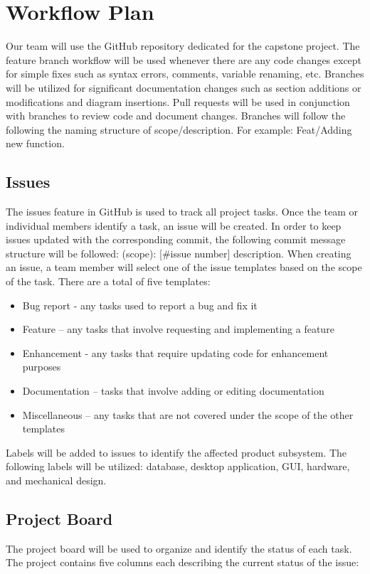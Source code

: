 \documentclass[12pt]{article}
\begin{document}
\section{Workflow Plan}
Our team will use the GitHub repository dedicated for the capstone project. The feature
branch workflow will be used whenever there are any code changes except for simple fixes such as syntax errors, comments, variable renaming, etc. 
Branches will be utilized for significant documentation changes such as section additions or modifications and diagram insertions. 
Pull requests will be used in conjunction with branches to review code and document changes.
Branches will follow the following the naming structure of scope/description. For example: Feat/Adding new function.

\subsection{Issues}
The issues feature in GitHub is used to track all project tasks. Once the team or individual members identify a task, an issue will be created. In order to keep issues updated with the corresponding commit, the following commit message structure will be followed: (scope): [\#issue number] description. When creating an issue, a team member will select one of the issue templates based on the scope of the task. There are a total of five templates: 

\begin{itemize}
	\item Bug report - any tasks used to report a bug and fix it
	\item Feature – any tasks that involve requesting and implementing a feature
	\item Enhancement - any tasks that require updating code for enhancement purposes
	\item Documentation – tasks that involve adding or editing documentation
	\item Miscellaneous – any tasks that are not covered under the scope of the other templates
\end{itemize}

\noindent
Labels will be added to issues to identify the affected product subsystem. The following labels will be utilized: 
database, desktop application, GUI, hardware, and mechanical design.

\subsection{Project Board}
The project board will be used to organize and identify the status of each task. 
The project contains five columns each describing the current status of the issue:
\end{document}
